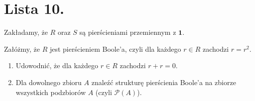 \chapter{Lista 10.}

Zakładamy, że $R$ oraz $S$ są pierścieniami przemiennym z $\mathbf{1}$.

\begin{problem}[1]
	Załóżmy, że $R$ jest pierścieniem Boole'a, czyli dla każdego $r\in R$ zachodzi $r = r^2$.
	\begin{enumerate}[label=\alph*)]
		\item Udowodnić, że dla każdego $r\in R$ zachodzi $r+r = 0.$
		\item Dla dowolnego zbioru  $A$ znaleźć strukturę pierścienia Boole'a na zbiorze wszystkich podzbiorów  $A$ (czyli $\mathcal{P}(A) $).
	\end{enumerate}
\end{problem} 
